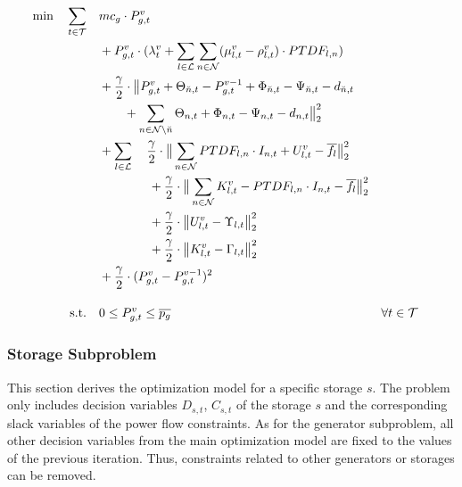  \begin{subequations}
	\begin{align}
		 \min \quad \sum_{t\in\mathcal{T}} \quad & mc_g \cdot P_{g,t}^v \label{eq:sub:gen-final}\\
		 & + P_{g,t}^v \cdot (\lambda_t^v + \sum_{l \in \mathcal{L}} \sum_{n \in \mathcal{N}} (\mu_{l,t}^v - \rho_{l,t}^v) \cdot PTDF_{l,n}) \nonumber \\ 
		 & + \frac{\gamma}{2} \cdot \big\| P_{g,t}^v + \Theta_{\breve{n},t} - P_{g,t}^{v-1} + \Phi_{\breve{n},t} - \Psi_{\breve{n},t} - d_{\breve{n},t} \nonumber \\
		 & \qquad + \sum_{n \in \mathcal{N} \setminus \breve{n}} \Theta_{n,t} + \Phi_{n,t} - \Psi_{n,t} - d_{n,t} \big\|^2_2 \nonumber \\
		 & + \sum_{l \in \mathcal{L}} \quad \frac{\gamma}{2} \cdot \big\| \sum_{n \in \mathcal{N}} PTDF_{l,n} \cdot I_{n,t} + U_{l,t}^v - \overline{f_l} \big\|^2_2 \nonumber \\
		 & \qquad \qquad + \frac{\gamma}{2} \cdot \big\| \sum_{n \in \mathcal{N}} K_{l,t}^v - PTDF_{l,n} \cdot I_{n,t} - \overline{f_l} \big\|^2_2 \nonumber \\
		 & \qquad \qquad + \frac{\gamma}{2} \cdot \big\|U_{l,t}^v - \Upsilon_{l,t}  \big\|^2_2 \nonumber\\
		 & \qquad \qquad + \frac{\gamma}{2} \cdot \big\|K_{l,t}^v - \Gamma_{l,t}  \big\|^2_2 \nonumber \\
		 & + \frac{\gamma}{2} \cdot (P_{g,t}^v - P_{g,t}^{v-1})^2 \nonumber \\[10pt]
		 \text{s.t.} \quad & 0 \leq P_{g,t}^v \leq \overline{p_g} && \forall t \in \mathcal{T}
	\end{align}
\end{subequations}

\subsubsection*{Storage Subproblem}

This section derives the optimization model for a specific storage $s$. The problem only includes decision variables $D_{s,t}$, $C_{s,t}$ of the storage $s$ and the corresponding slack variables of the power flow constraints. As for the generator subproblem, all other decision variables from the main optimization model are fixed to the values of the previous iteration. Thus, constraints related to other generators or storages can be removed. \\

